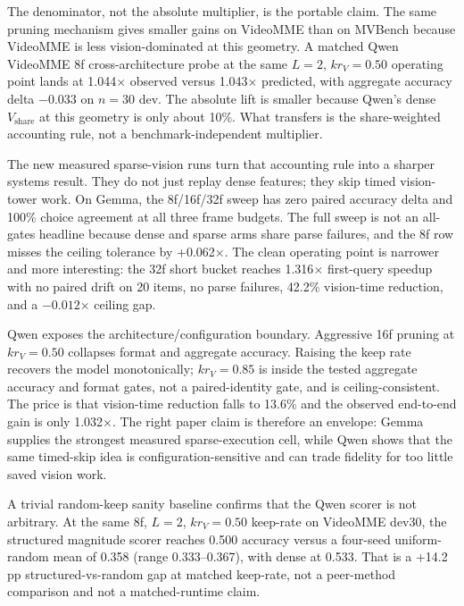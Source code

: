 The denominator, not the absolute multiplier, is the portable claim. The same
pruning mechanism gives smaller gains on VideoMME than on MVBench because
VideoMME is less vision-dominated at this geometry. A matched Qwen VideoMME 8f
cross-architecture probe at the same \(L=2\), \(kr_V=0.50\) operating point
lands at 1.044$\times$ observed versus
1.043$\times$ predicted, with aggregate accuracy delta $-0.033$ on \(n=30\)
dev. The absolute lift is smaller because Qwen's dense
\(V_{\mathrm{share}}\) at this geometry is only about 10\%. What transfers is
the share-weighted accounting rule, not a benchmark-independent multiplier.

The new measured sparse-vision runs turn that accounting rule into a sharper
systems result. They do not just replay dense features; they skip timed
vision-tower work. On Gemma, the 8f/16f/32f sweep has zero paired accuracy
delta and 100\% choice agreement at all three frame budgets. The full sweep is
not an all-gates headline because dense and sparse arms share parse failures,
and the 8f row misses the ceiling tolerance by +0.062$\times$. The clean
operating point is narrower and more interesting: the 32f short bucket reaches
1.316$\times$ first-query speedup with no paired drift on 20 items, no parse
failures, 42.2\% vision-time reduction, and a \(-0.012\)\(\times\) ceiling
gap.

Qwen exposes the architecture/configuration boundary. Aggressive 16f pruning
at \(kr_V=0.50\) collapses format and aggregate accuracy. Raising the keep rate
recovers the model monotonically; \(kr_V=0.85\) is inside the tested aggregate
accuracy and format gates, not a paired-identity gate, and is ceiling-consistent.
The price is that vision-time reduction falls to
13.6\% and the observed end-to-end gain is only 1.032$\times$. The right
paper claim is therefore an envelope: Gemma supplies the strongest measured
sparse-execution cell, while Qwen shows that the same timed-skip idea is
configuration-sensitive and can trade fidelity for too little saved vision
work.

A trivial random-keep sanity baseline confirms that the Qwen scorer is not
arbitrary. At the same 8f, \(L=2\), \(kr_V=0.50\) keep-rate on VideoMME dev30,
the structured magnitude scorer reaches 0.500 accuracy versus a four-seed
uniform-random mean of 0.358 (range 0.333--0.367), with dense at 0.533. That is
a +14.2\,pp structured-vs-random gap at matched keep-rate, not a peer-method
comparison and not a matched-runtime claim.



